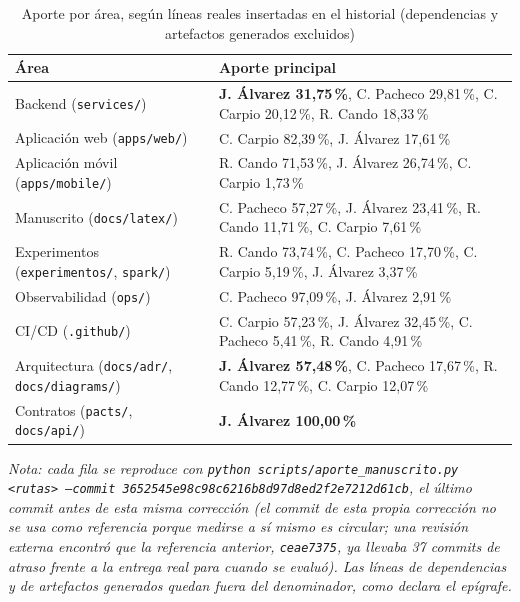 \begin{table}[H]
\centering
\caption{Aporte por área, según líneas reales insertadas en el historial (dependencias y
artefactos generados excluidos)}
\label{tab:aporte-integrantes}
\small
\begin{tabular}{@{}p{4.2cm}p{9cm}@{}}
\toprule
\textbf{Área} & \textbf{Aporte principal} \\
\midrule
Backend (\texttt{services/}) & \textbf{J. Álvarez 31,75\,\%}, C. Pacheco 29,81\,\%, C. Carpio 20,12\,\%, R. Cando 18,33\,\% \\
Aplicación web (\texttt{apps/web/}) & C. Carpio 82,39\,\%, J. Álvarez 17,61\,\% \\
Aplicación móvil (\texttt{apps/mobile/}) & R. Cando 71,53\,\%, J. Álvarez 26,74\,\%, C. Carpio 1,73\,\% \\
Manuscrito (\texttt{docs/latex/}) & C. Pacheco 57,27\,\%, J. Álvarez 23,41\,\%, R. Cando 11,71\,\%, C. Carpio 7,61\,\% \\
Experimentos (\texttt{experimentos/}, \texttt{spark/}) & R. Cando 73,74\,\%, C. Pacheco 17,70\,\%, C. Carpio 5,19\,\%, J. Álvarez 3,37\,\% \\
Observabilidad (\texttt{ops/}) & C. Pacheco 97,09\,\%, J. Álvarez 2,91\,\% \\
CI/CD (\texttt{.github/}) & C. Carpio 57,23\,\%, J. Álvarez 32,45\,\%, C. Pacheco 5,41\,\%, R. Cando 4,91\,\% \\
Arquitectura (\texttt{docs/adr/}, \texttt{docs/diagrams/}) & \textbf{J. Álvarez 57,48\,\%}, C. Pacheco 17,67\,\%, R. Cando 12,77\,\%, C. Carpio 12,07\,\% \\
Contratos (\texttt{pacts/}, \texttt{docs/api/}) & \textbf{J. Álvarez 100,00\,\%} \\
\bottomrule
\end{tabular}

\vspace{2pt}
{\footnotesize\textit{Nota: cada fila se reproduce con
\texttt{python scripts/aporte\_manuscrito.py <rutas> --commit 3652545e98c98c6216b8d97d8ed2f2e7212d61cb},
el último commit antes de esta misma corrección (el commit de esta propia corrección no se usa
como referencia porque medirse a sí mismo es circular; una revisión externa encontró que la
referencia anterior, \texttt{ceae7375}, ya llevaba 37 commits de atraso frente a la entrega real
para cuando se evaluó). Las líneas de dependencias y de artefactos generados quedan fuera del
denominador, como declara el epígrafe.}}
\end{table}

